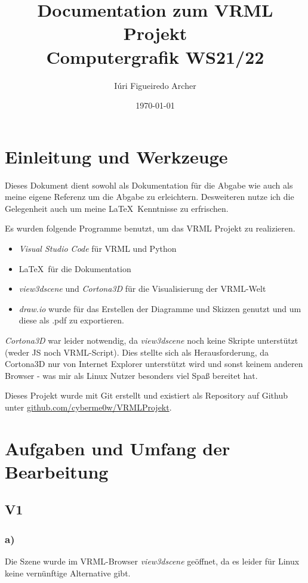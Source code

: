 \documentclass{article}
\author{Iúri Figueiredo Archer}
\date{\today}
\title{Documentation zum VRML Projekt\\\large{Computergrafik WS21/22}}
\begin{document}
\maketitle
\section*{Einleitung und Werkzeuge}
Dieses Dokument dient sowohl als Dokumentation für die Abgabe wie auch
als meine eigene Referenz um die Abgabe zu erleichtern. Desweiteren
nutze ich die Gelegenheit auch um meine \LaTeX\ Kenntnisse zu
erfrischen.

Es wurden folgende Programme benutzt, um das VRML Projekt zu
realizieren.
\begin{itemize}
\item \textit{Visual Studio Code} für VRML und Python
\item \LaTeX\ für die Dokumentation
\item \textit{view3dscene} und \textit{Cortona3D} für die
Visualisierung der VRML-Welt
\item \textit{draw.io} wurde für das Erstellen der Diagramme und
Skizzen genutzt und um diese als .pdf zu exportieren.
\end{itemize}

\textit{Cortona3D} war leider notwendig, da \textit{view3dscene} noch
keine Skripte unterstützt (weder JS noch VRML-Script). 
Dies stellte sich als Herausforderung, da Cortona3D nur von Internet
Explorer unterstützt wird und sonst keinem anderen Browser - was mir
als Linux Nutzer besonders viel Spaß bereitet hat.

Dieses Projekt wurde mit Git erstellt und existiert als
Repository auf Github unter \url{github.com/cyberme0w/VRMLProjekt}.




\newpage

\section{Aufgaben und Umfang der Bearbeitung}
\subsection*{V1}
\subsubsection*{a)}
Die Szene wurde im VRML-Browser \textit{view3dscene} geöffnet, da es
leider für Linux keine vernünftige Alternative gibt. 
\end{document}
